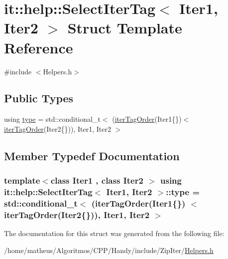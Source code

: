 \hypertarget{structit_1_1help_1_1SelectIterTag_3_01Iter1_00_01Iter2_01_4}{}\section{it\+:\+:help\+:\+:Select\+Iter\+Tag$<$ Iter1, Iter2 $>$ Struct Template Reference}
\label{structit_1_1help_1_1SelectIterTag_3_01Iter1_00_01Iter2_01_4}


{\ttfamily \#include $<$Helpers.\+h$>$}

\subsection*{Public Types}
\begin{DoxyCompactItemize}
\item 
using \hyperlink{structit_1_1help_1_1SelectIterTag_3_01Iter1_00_01Iter2_01_4_ab9e5a0f79cab82e1c16f3a4a38029df9}{type} = std\+::conditional\+\_\+t$<$ (\hyperlink{namespaceit_1_1help_ad5efd6f9a3703da509d0853b95b515db}{iter\+Tag\+Order}(Iter1\{\})$<$ \hyperlink{namespaceit_1_1help_ad5efd6f9a3703da509d0853b95b515db}{iter\+Tag\+Order}(Iter2\{\})), Iter1, Iter2 $>$
\end{DoxyCompactItemize}


\subsection{Member Typedef Documentation}
\subsubsection[{\texorpdfstring{type}{type}}]{\setlength{\rightskip}{0pt plus 5cm}template$<$class Iter1 , class Iter2 $>$ using {\bf it\+::help\+::\+Select\+Iter\+Tag}$<$ Iter1, Iter2 $>$\+::{\bf type} =  std\+::conditional\+\_\+t$<$ ({\bf iter\+Tag\+Order}(Iter1\{\}) $<$ {\bf iter\+Tag\+Order}(Iter2\{\})), Iter1, Iter2 $>$}\hypertarget{structit_1_1help_1_1SelectIterTag_3_01Iter1_00_01Iter2_01_4_ab9e5a0f79cab82e1c16f3a4a38029df9}{}\label{structit_1_1help_1_1SelectIterTag_3_01Iter1_00_01Iter2_01_4_ab9e5a0f79cab82e1c16f3a4a38029df9}


The documentation for this struct was generated from the following file\+:\begin{DoxyCompactItemize}
\item 
/home/matheus/\+Algoritmos/\+C\+P\+P/\+Handy/include/\+Zip\+Iter/\hyperlink{ZipIter_2Helpers_8h}{Helpers.\+h}\end{DoxyCompactItemize}
